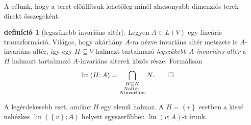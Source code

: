 \documentclass[a4paper, showtrims]{memoir}
\theoremstyle{plain}
\theoremstyle{remark}
\theoremstyle{definition}
\newtheorem{definition}[proposition]{definíció}
\DeclareMathOperator{\lin}{lin}
\begin{document}
A célunk, hogy a teret előállítsuk lehetőleg minél alacsonyabb dimenziós terek direkt összegeként.

\begin{definition}[legszűkebb invariáns altér]
	Legyen $A\in L\left( V \right)$ egy lineáris transzformáció.
	Világos, hogy akárhány $A$-ra nézve invariáns altér metszete is $A$-invariáns altér,
	így egy $H\subseteq V$ halmazt tartalmazó
	\emph{legszűkebb $A$-invariáns altér}
	a $H$ halmazt tartalmazó $A$-invariáns alterek közös része.
	Formálisan
	\[
		\lin\left( H;A \right)
		=
		\bigcap_{
			\substack{
				H\subseteq N\\
				N\text{altér }\\
				N\text{invariáns}}
		}N.\qedhere
	\]
\end{definition}
A legérdekesebb eset, amikor $H$ egy elemű halmaz.
A $H=\left\{ v \right\}$ esetben a kissé nehézkes
$\lin\left( \left\{ v \right\};A \right)$ helyett egyszerűbben $\lin\left( v;A \right)$-t írunk.
\end{document}
